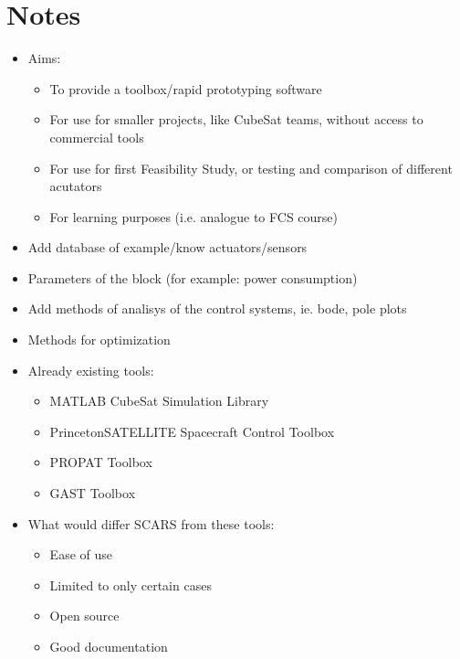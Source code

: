 \section*{Notes}
\begin{itemize}
    \item Aims:
    \begin{itemize}
        \item To provide a toolbox/rapid prototyping software
        \item For use for smaller projects, like CubeSat teams, without access to commercial tools
        \item For use for first Feasibility Study, or testing and comparison of different acutators
        \item For learning purposes (i.e. analogue to FCS course) 
    \end{itemize}
    \item Add database of example/know actuators/sensors
    \item Parameters of the block (for example: power consumption)
    \item Add methods of analisys of the control systems, ie. bode, pole plots 
    \item Methods for optimization
    \item Already existing tools:
    \begin{itemize}
            \item MATLAB CubeSat Simulation Library
            \item PrincetonSATELLITE Spacecraft Control Toolbox
            \item PROPAT Toolbox
            \item GAST Toolbox
          \end{itemize}
    \item What would differ SCARS from these tools:
    \begin{itemize}
            \item Ease of use
            \item Limited to only certain cases
            \item Open source
            \item Good documentation
        \end{itemize}
\end{itemize}

\newpage

